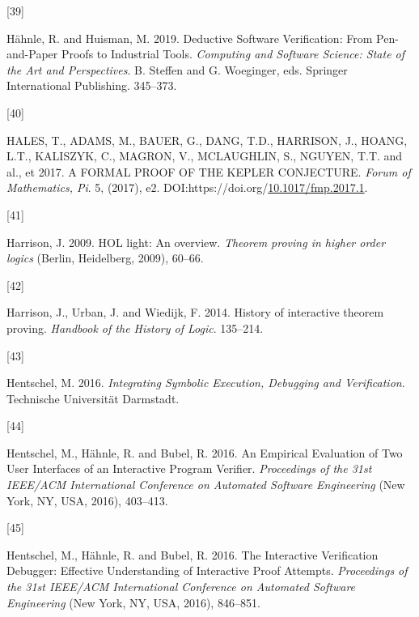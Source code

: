 \documentclass[
]{article}
\newlength{\cslhangindent}
\newlength{\csllabelwidth}
\newlength{\cslentryspacingunit} %
\newenvironment{CSLReferences}[2] %
 {%
  \setlength{\parindent}{0pt}
  \ifodd #1
  \let\oldpar\par
  \def\par{\hangindent=\cslhangindent\oldpar}
  \fi
  \setlength{\parskip}{#2\cslentryspacingunit}
 }%
 {}
\newcommand{\CSLLeftMargin}[1]{\parbox[t]{\csllabelwidth}{#1}}
\newcommand{\CSLRightInline}[1]{\parbox[t]{\linewidth - \csllabelwidth}{#1}\break}
\begin{document}
\begin{CSLReferences}{0}{0}
\leavevmode{}%
\CSLLeftMargin{{[}39{]} }
\CSLRightInline{Hähnle, R. and Huisman, M. 2019. Deductive {Software}
{Verification}: {From} {Pen}-and-{Paper} {Proofs} to {Industrial}
{Tools}. \emph{Computing and {Software} {Science}: {State} of the {Art}
and {Perspectives}}. B. Steffen and G. Woeginger, eds. Springer
International Publishing. 345--373.}

\leavevmode{}%
\CSLLeftMargin{{[}40{]} }
\CSLRightInline{HALES, T., ADAMS, M., BAUER, G., DANG, T.D., HARRISON,
J., HOANG, L.T., KALISZYK, C., MAGRON, V., MCLAUGHLIN, S., NGUYEN, T.T.
and al., et 2017. A FORMAL PROOF OF THE KEPLER CONJECTURE. \emph{Forum
of Mathematics, Pi}. 5, (2017), e2.
DOI:https://doi.org/\href{https://doi.org/10.1017/fmp.2017.1}{10.1017/fmp.2017.1}.}

\leavevmode{}%
\CSLLeftMargin{{[}41{]} }
\CSLRightInline{Harrison, J. 2009. HOL light: An overview. \emph{Theorem
proving in higher order logics} (Berlin, Heidelberg, 2009), 60--66.}

\leavevmode{}%
\CSLLeftMargin{{[}42{]} }
\CSLRightInline{Harrison, J., Urban, J. and Wiedijk, F. 2014. History of
interactive theorem proving. \emph{Handbook of the History of Logic}.
135--214.}

\leavevmode{}%
\CSLLeftMargin{{[}43{]} }
\CSLRightInline{Hentschel, M. 2016. \emph{Integrating {Symbolic}
{Execution}, {Debugging} and {Verification}}. Technische Universität
Darmstadt.}

\leavevmode{}%
\CSLLeftMargin{{[}44{]} }
\CSLRightInline{Hentschel, M., Hähnle, R. and Bubel, R. 2016. An
{Empirical} {Evaluation} of {Two} {User} {Interfaces} of an
{Interactive} {Program} {Verifier}. \emph{Proceedings of the 31st
{IEEE}/{ACM} {International} {Conference} on {Automated} {Software}
{Engineering}} (New York, NY, USA, 2016), 403--413.}

\leavevmode{}%
\CSLLeftMargin{{[}45{]} }
\CSLRightInline{Hentschel, M., Hähnle, R. and Bubel, R. 2016. The
{Interactive} {Verification} {Debugger}: {Effective} {Understanding} of
{Interactive} {Proof} {Attempts}. \emph{Proceedings of the 31st
{IEEE}/{ACM} {International} {Conference} on {Automated} {Software}
{Engineering}} (New York, NY, USA, 2016), 846--851.}


\end{CSLReferences}
\end{document}
